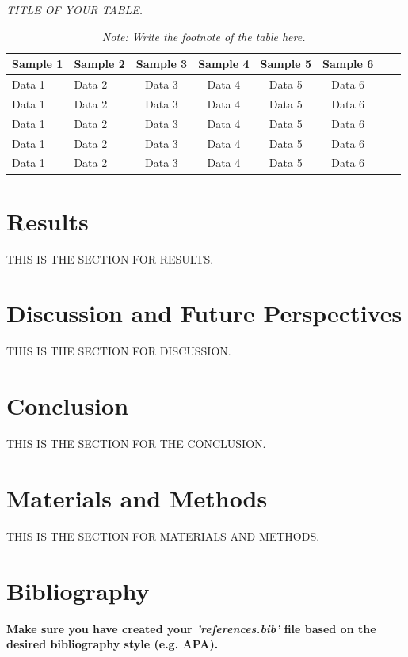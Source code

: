 \documentclass[a4paper, 12pt]{article}
\begin{document}
\begin{table}[h!]
    \centering
    \caption{\textit{TITLE OF YOUR TABLE.}}
    \label{tab:tab1}
    \begin{tabular}{llccccll}
        \toprule
        \textbf{Sample 1} & \textbf{Sample 2} & \textbf{Sample 3} & \textbf{Sample 4} & \textbf{Sample 5} & \textbf{Sample 6} \\
        \midrule
        Data 1 & Data 2 & Data 3 & Data 4 & Data 5 & Data 6 \\
        Data 1 & Data 2 & Data 3 & Data 4 & Data 5 & Data 6 \\
        Data 1 & Data 2 & Data 3 & Data 4 & Data 5 & Data 6 \\
        Data 1 & Data 2 & Data 3 & Data 4 & Data 5 & Data 6 \\
        Data 1 & Data 2 & Data 3 & Data 4 & Data 5 & Data 6 \\
        \bottomrule
    \end{tabular}
    \caption*{\textit{Note: Write the footnote of the table here.}}
\end{table}

\clearpage
\section{Results}
THIS IS THE SECTION FOR RESULTS. 

\clearpage
\section{Discussion and Future Perspectives}
THIS IS THE SECTION FOR DISCUSSION.

\clearpage
\section{Conclusion}
THIS IS THE SECTION FOR THE CONCLUSION.

\clearpage
\section{Materials and Methods}
THIS IS THE SECTION FOR MATERIALS AND METHODS.

\clearpage
\section{Bibliography}
\textbf{Make sure you have created your \textit{'references.bib'} file based on the desired bibliography style (e.g. APA). }
\printbibliography

\clearpage
\section*{}
\thispagestyle{empty}
\phantom{}
\end{document}
